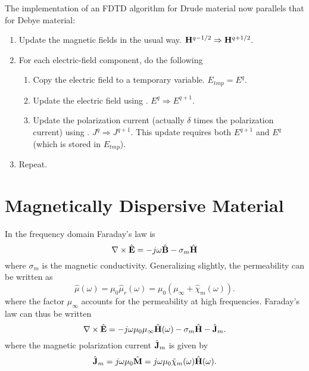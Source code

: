 The implementation of an FDTD algorithm for Drude material now
parallels that for Debye material:
\begin{enumerate}
\item Update the magnetic fields in the usual way.  
      $\mathbf{H}^{q-1/2}\Rightarrow \mathbf{H}^{q+1/2}$.
\item For each electric-field component, do the following
\begin{enumerate}
\item Copy the electric field to a temporary variable.
      $E_{\mathit{tmp}}=E^q$.
\item Update the electric field using .
      $E^{q}\Rightarrow E^{q+1}$.
\item Update the polarization current (actually $\delta$ times the
      polarization current) using
      . $J^{q}\Rightarrow J^{q+1}$.
      This update requires both $E^{q+1}$ and $E^q$ (which is stored
      in $E_{\mathit{tmp}}$).
\end{enumerate}
\item Repeat.
\end{enumerate}

\section{Magnetically Dispersive Material}

In the frequency domain Faraday's law is
\begin{equation}
  \nabla\times\hat{\mathbf{E}} = -j\omega\hat{\mathbf{B}} - \sigma_m\hat{\mathbf{H}}
\end{equation}
where $\sigma_m$ is the magnetic conductivity.  Generalizing
 slightly, the permeability can be written
as
\begin{equation}
 \hat{\mu}(\omega) = \mu_0\hat{\mu}_r(\omega) =
     \mu_0(\mu_\infty + \hat{\chi}_m(\omega)).
\end{equation}
where the factor $\mu_\infty$ accounts for the permeability at high
frequencies.  Faraday's law can thus be written
\begin{equation}
  \nabla\times\hat{\mathbf{E}} = -j\omega\mu_0\mu_\infty\hat{\mathbf{H}}(\omega)
	 - \sigma_m\hat{\mathbf{H}}
         - \hat{\mathbf{J}}_m.
\end{equation}
where the magnetic polarization current $\hat{\mathbf{J}}_m$ is given by
\begin{equation}
  \hat{\mathbf{J}}_m = j\omega\mu_0\hat{\mathbf{M}} = 
  j\omega\mu_0\hat{\chi}_m(\omega)\hat{\mathbf{H}}(\omega).
\end{equation}

